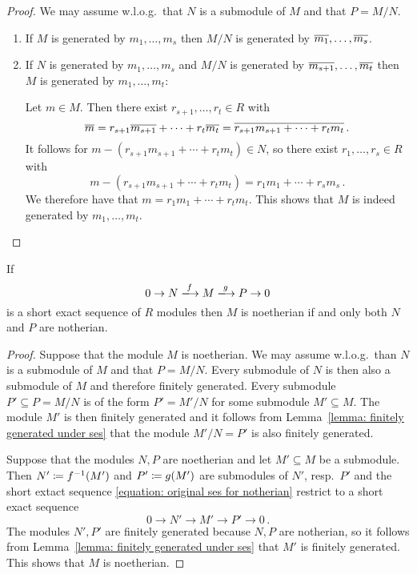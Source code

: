 \begin{proof}
  We may assume w.l.o.g.\ that $N$ is a submodule of $M$ and that $P = M/N$.
  \begin{enumerate}
    \item
      If $M$ is generated by $m_1, \dotsc, m_s$ then $M/N$ is generated by $\overline{m_1}, \dotsc, \overline{m_s}$.
    \item
      If $N$ is generated by $m_1, \dotsc, m_s$ and $M/N$ is generated by $\overline{m_{s+1}}, \dotsc, \overline{m_t}$ then $M$ is generated by $m_1, \dotsc, m_t$:
      
      Let $m \in M$.
      Then there exist $r_{s+1}, \dotsc, r_t \in R$ with
      \[
          \overline{m}
        = r_{s+1} \overline{m_{s+1}} + \dotsb + r_t \overline{m_t}
        = \overline{r_{s+1} m_{s+1} + \dotsb + r_t m_t} \,.
      \]
      It follows for $m - (r_{s+1} m_{s+1} + \dotsb + r_t m_t) \in N$, so there exist $r_1, \dotsc, r_s \in R$ with
      \[
          m - (r_{s+1} m_{s+1} + \dotsb + r_t m_t)
        = r_1 m_1 + \dotsb + r_s m_s \,.
      \]
      We therefore have that $m = r_1 m_1 + \dotsb + r_t m_t$.
      This shows that $M$ is indeed generated by $m_1, \dotsc, m_t$.
    \qedhere
  \end{enumerate}
\end{proof}


\begin{corollary}
  \label{corollary: short exact sequence of noetherian}
  If
  \begin{equation}
    \label{equation: original ses for notherian}
                        0
    \to                 N
    \xlongrightarrow{f} M
    \xlongrightarrow{g} P
    \to                 0
  \end{equation}
  is a short exact sequence of $R$ modules then $M$ is noetherian if and only both $N$ and $P$ are notherian.
\end{corollary}


\begin{proof}
  Suppose that the module $M$ is noetherian.
  We may assume w.l.o.g.\ than $N$ is a submodule of $M$ and that $P = M/N$.
  Every submodule of $N$ is then also a submodule of $M$ and therefore finitely generated.
  Every submodule $P' \subseteq P = M/N$ is of the form $P' = M'/N$ for some submodule $M' \subseteq M$.
  The module $M'$ is then finitely generated and it follows from Lemma~\ref{lemma: finitely generated under ses} that the module $M'/N = P'$ is also finitely generated.

  Suppose that the modules $N, P$ are noetherian and let $M' \subseteq M$ be a submodule.
  Then $N' \coloneqq f^{-1}(M')$ and $P' \coloneqq g(M')$ are submodules of $N'$, resp.\ $P'$ and the short extact sequence \eqref{equation: original ses for notherian} restrict to a short exact sequence
  \[
        0
    \to N'
    \to M'
    \to P'
    \to 0 \,.
  \]
  The modules $N', P'$ are finitely generated because $N, P$ are notherian, so it follows from Lemma~\ref{lemma: finitely generated under ses} that $M'$ is finitely generated.
  This shows that $M$ is noetherian.
\end{proof}



